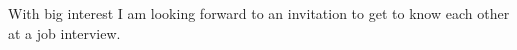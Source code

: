 \versionLanguageStart%
		With big interest I am looking forward to an invitation to get to know each other at a job interview.
\versionLanguageEnd